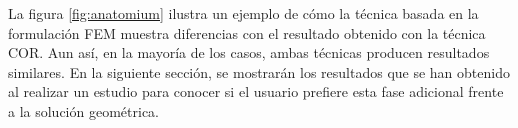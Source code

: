 La figura \ref{fig:anatomium} ilustra un ejemplo de cómo la técnica basada en la formulación \ac{FEM} muestra diferencias con el resultado obtenido con la técnica \ac{COR}. Aun así, en la mayoría de los casos, ambas técnicas producen resultados similares. En la siguiente sección, se mostrarán los resultados que se han obtenido al realizar un estudio para conocer si el usuario prefiere esta fase adicional frente a la solución geométrica.


 

 
